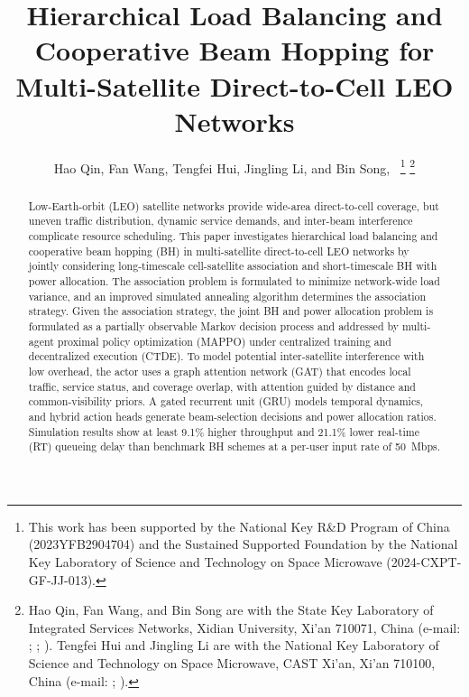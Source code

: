 \documentclass[journal]{IEEEtran}
\begin{document}
\title{Hierarchical Load Balancing and Cooperative Beam Hopping for Multi-Satellite Direct-to-Cell LEO Networks}

\author{Hao Qin, Fan Wang, Tengfei Hui, Jingling Li, and Bin Song,~%
\thanks{This work has been supported by the National Key R\&D Program of China (2023YFB2904704) and the Sustained Supported Foundation by the National Key Laboratory of Science and Technology on Space Microwave (2024-CXPT-GF-JJ-013).}%
\thanks{Hao Qin, Fan Wang, and Bin Song are with the State Key Laboratory of Integrated Services Networks, Xidian University, Xi'an 710071, China (e-mail: \HaoQinEmail; \FanWangEmail; \BinSongEmail). Tengfei Hui and Jingling Li are with the National Key Laboratory of Science and Technology on Space Microwave, CAST Xi'an, Xi'an 710100, China (e-mail: \TengfeiHuiEmail; \JinglingLiEmail).}%
}



\maketitle
\begin{abstract}
Low-Earth-orbit (LEO) satellite networks provide wide-area direct-to-cell coverage, but uneven traffic distribution, dynamic service demands, and inter-beam interference complicate resource scheduling. This paper investigates hierarchical load balancing and cooperative beam hopping (BH) in multi-satellite direct-to-cell LEO networks by jointly considering long-timescale cell-satellite association and short-timescale BH with power allocation. The association problem is formulated to minimize network-wide load variance, and an improved simulated annealing algorithm determines the association strategy. Given the association strategy, the joint BH and power allocation problem is formulated as a partially observable Markov decision process and addressed by multi-agent proximal policy optimization (MAPPO) under centralized training and decentralized execution (CTDE). To model potential inter-satellite interference with low overhead, the actor uses a graph attention network (GAT) that encodes local traffic, service status, and coverage overlap, with attention guided by distance and common-visibility priors. A gated recurrent unit (GRU) models temporal dynamics, and hybrid action heads generate beam-selection decisions and power allocation ratios. Simulation results show at least 9.1\% higher throughput and 21.1\% lower real-time (RT) queueing delay than benchmark BH schemes at a per-user input rate of 50~Mbps.

\end{abstract}
\end{document}

